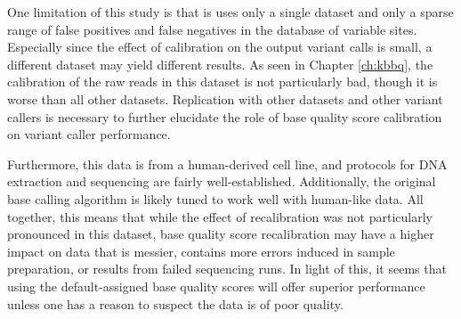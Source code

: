 One limitation of this study is that is uses only a single dataset and only a sparse range of false positives and false negatives in the database of variable sites. Especially since the effect of calibration on the output variant calls is small, a different dataset may yield different results. As seen in Chapter \ref{ch:kbbq}, the calibration of the raw reads in this dataset is not particularly bad, though it is worse than all other datasets. Replication with other datasets and other variant callers is necessary to further elucidate the role of base quality score calibration on variant caller performance.

Furthermore, this data is from a human-derived cell line, and protocols for DNA extraction and sequencing are fairly well-established. Additionally, the original base calling algorithm is likely tuned to work well with human-like data. All together, this means that while the effect of recalibration was not particularly pronounced in this dataset, base quality score recalibration may have a higher impact on data that is messier, contains more errors induced in sample preparation, or results from failed sequencing runs. In light of this, it seems that using the default-assigned base quality scores will offer superior performance unless one has a reason to suspect the data is of poor quality.


